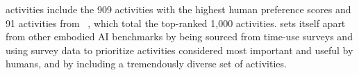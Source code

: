 
\benchmark activities include the 909 activities with the highest human preference scores and 91 activities from \oldbenchmark~\cite{srivastava2021behavior}, which total the top-ranked 1,000 activities. \benchmark sets itself apart from other embodied AI benchmarks by being sourced from time-use surveys and using survey data to prioritize activities considered most important and useful by humans, and by including a tremendously diverse set of activities. %





